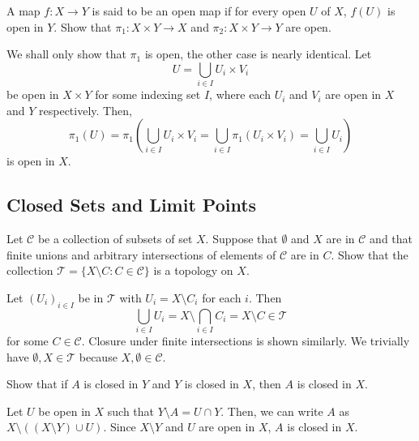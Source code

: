 	\begin{exercise}
		\label{ex: 16.4}
		A map $f:X\to Y$ is said to be an open map if for every open $U$ of $X$, $f(U)$ is open in $Y$. Show that $\pi_1:X\times Y\to X$ and $\pi_2:X\times Y\to Y$ are open. 
	\end{exercise}
	\begin{solution*}
		We shall only show that $\pi_1$ is open, the other case is nearly identical. Let
		\[ U = \bigcup_{i\in I} U_i \times V_i \]
		be open in $X\times Y$ for some indexing set $I$, where each $U_i$ and $V_i$ are open in $X$ and $Y$ respectively. Then,
		\[ \pi_1(U) = \pi_1 \left(\bigcup_{i\in I} U_i\times V_i = \bigcup_{i\in I} \pi_1(U_i\times V_i) = \bigcup_{i\in I} U_i \right) \]
		is open in $X$.
	\end{solution*}






\setcounter{subsection}{16}
\subsection{Closed Sets and Limit Points}

	\begin{exercise}
		Let $\mathcal{C}$ be a collection of subsets of set $X$. Suppose that $\emptyset$ and $X$ are in $\mathcal{C}$ and that finite unions and arbitrary intersections of elements of $\mathcal{C}$ are in $C$. Show that the collection $\mathcal{T}=\{X\setminus C:C\in\mathcal{C}\}$ is a topology on $X$.
	\end{exercise}
	\begin{solution*}
		Let $(U_i)_{i\in I}$ be in $\mathcal{T}$ with $U_i = X\setminus C_i$ for each $i$. Then
		\[ \bigcup_{i\in I} U_i = X \setminus \bigcap_{i\in I} C_i = X\setminus C \in \mathcal{T} \]
		for some $C\in\mathcal{C}$. Closure under finite intersections is shown similarly. We trivially have $\emptyset,X\in\mathcal{T}$ because $X,\emptyset\in\mathcal{C}$.
	\end{solution*}

	\begin{exercise}
		Show that if $A$ is closed in $Y$ and $Y$ is closed in $X$, then $A$ is closed in $X$.
	\end{exercise}
	\begin{solution*}
		Let $U$ be open in $X$ such that $Y\setminus A = U\cap Y$. Then, we can write $A$ as $X\setminus ((X\setminus Y)\cup U)$. Since $X\setminus Y$ and $U$ are open in $X$, $A$ is closed in $X$.
	\end{solution*}

